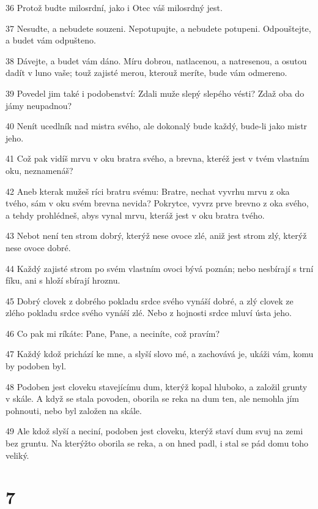 \par 36 Protož budte milosrdní, jako i Otec váš milosrdný jest.
\par 37 Nesudte, a nebudete souzeni. Nepotupujte, a nebudete potupeni. Odpouštejte, a budet vám odpušteno.
\par 38 Dávejte, a budet vám dáno. Míru dobrou, natlacenou, a natresenou, a osutou dadít v luno vaše; touž zajisté merou, kterouž meríte, bude vám odmereno.
\par 39 Povedel jim také i podobenství: Zdali muže slepý slepého vésti? Zdaž oba do jámy neupadnou?
\par 40 Nenít ucedlník nad mistra svého, ale dokonalý bude každý, bude-li jako mistr jeho.
\par 41 Což pak vidíš mrvu v oku bratra svého, a brevna, kteréž jest v tvém vlastním oku, neznamenáš?
\par 42 Aneb kterak mužeš ríci bratru svému: Bratre, nechat vyvrhu mrvu z oka tvého, sám v oku svém brevna nevida? Pokrytce, vyvrz prve brevno z oka svého, a tehdy prohlédneš, abys vynal mrvu, kteráž jest v oku bratra tvého.
\par 43 Nebot není ten strom dobrý, kterýž nese ovoce zlé, aniž jest strom zlý, kterýž nese ovoce dobré.
\par 44 Každý zajisté strom po svém vlastním ovoci bývá poznán; nebo nesbírají s trní fíku, ani s hloží sbírají hroznu.
\par 45 Dobrý clovek z dobrého pokladu srdce svého vynáší dobré, a zlý clovek ze zlého pokladu srdce svého vynáší zlé. Nebo z hojnosti srdce mluví ústa jeho.
\par 46 Co pak mi ríkáte: Pane, Pane, a neciníte, což pravím?
\par 47 Každý kdož prichází ke mne, a slyší slovo mé, a zachovává je, ukáži vám, komu by podoben byl.
\par 48 Podoben jest cloveku stavejícímu dum, kterýž kopal hluboko, a založil grunty v skále. A když se stala povoden, oborila se reka na dum ten, ale nemohla jím pohnouti, nebo byl založen na skále.
\par 49 Ale kdož slyší a neciní, podoben jest cloveku, kterýž staví dum svuj na zemi bez gruntu. Na kterýžto oborila se reka, a on hned padl, i stal se pád domu toho veliký.

\chapter{7}

